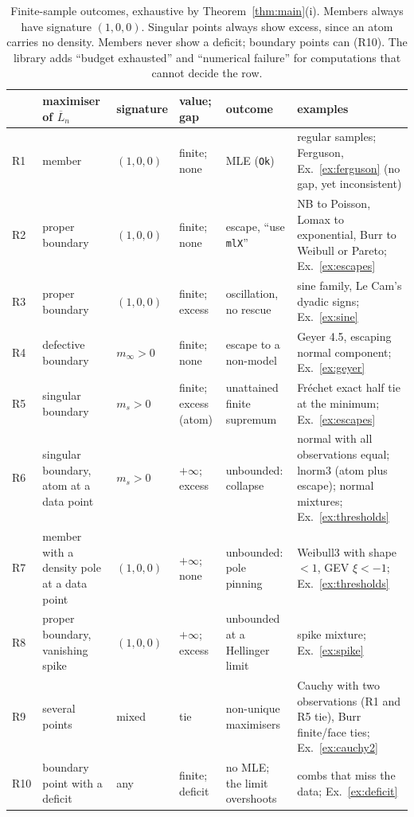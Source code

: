 \documentclass[11pt]{article}
\newcommand{\bL}{\overline L}
\theoremstyle{definition}
\theoremstyle{remark}
\begin{document}
\begin{table}[ht]
\centering\footnotesize
\begin{tabular}{@{}p{0.45cm}>{\raggedright\arraybackslash}p{2.8cm}>{\raggedright\arraybackslash}p{1.6cm}>{\raggedright\arraybackslash}p{2.0cm}>{\raggedright\arraybackslash}p{2.8cm}>{\raggedright\arraybackslash}p{4.6cm}@{}}
\toprule
 & maximiser of $\bL_n$ & signature & value; gap & outcome & examples\\
\midrule
R1 & member & $(1,0,0)$ & finite; none & MLE (\texttt{Ok}) & regular samples; Ferguson, Ex.~\ref{ex:ferguson} (no gap, yet inconsistent)\\
R2 & proper boundary & $(1,0,0)$ & finite; none & escape, ``use \texttt{mlX}'' & NB to Poisson, Lomax to exponential, Burr to Weibull or Pareto; Ex.~\ref{ex:escapes}\\
R3 & proper boundary & $(1,0,0)$ & finite; excess & oscillation, no rescue & sine family, Le Cam's dyadic signs; Ex.~\ref{ex:sine}\\
R4 & defective boundary & $m_\infty>0$ & finite; none & escape to a non-model & Geyer 4.5, escaping normal component; Ex.~\ref{ex:geyer}\\
R5 & singular boundary & $m_s>0$ & finite; excess (atom) & unattained finite supremum & Fr\'echet exact half tie at the minimum; Ex.~\ref{ex:escapes}\\
\midrule
R6 & singular boundary, atom at a data point & $m_s>0$ & $+\infty$; excess & unbounded: collapse & normal with all observations equal; lnorm3 (atom plus escape); normal mixtures; Ex.~\ref{ex:thresholds}\\
R7 & member with a density pole at a data point & $(1,0,0)$ & $+\infty$; none & unbounded: pole pinning & Weibull3 with shape $<1$, GEV $\xi<-1$; Ex.~\ref{ex:thresholds}\\
R8 & proper boundary, vanishing spike & $(1,0,0)$ & $+\infty$; excess & unbounded at a Hellinger limit & spike mixture; Ex.~\ref{ex:spike}\\
\midrule
R9 & several points & mixed & tie & non-unique maximisers & Cauchy with two observations (R1 and R5 tie), Burr finite/face ties; Ex.~\ref{ex:cauchy2}\\
\midrule
R10 & boundary point with a deficit & any & finite; deficit & no MLE; the limit overshoots & combs that miss the data; Ex.~\ref{ex:deficit}\\
\bottomrule
\end{tabular}
\caption{Finite-sample outcomes, exhaustive by Theorem~\ref{thm:main}(i).
Members always have signature $(1,0,0)$. Singular points always show
excess, since an atom carries no density. Members never show a deficit;
boundary points can (R10). The library adds ``budget exhausted'' and
``numerical failure'' for computations that cannot decide the row.}
\label{tab:outcomes}
\end{table}
\end{document}
